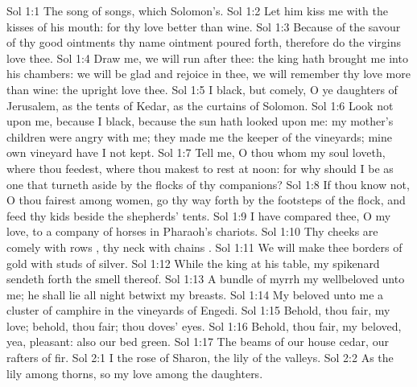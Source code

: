 \vs Sol 1:1 The song of songs, which  Solomon's.
\vs Sol 1:2 Let him kiss me with the kisses of his mouth: for thy love  better than wine.
\vs Sol 1:3 Because of the savour of thy good ointments thy name  ointment poured forth, therefore do the virgins love thee.
\vs Sol 1:4 Draw me, we will run after thee: the king hath brought me into his chambers: we will be glad and rejoice in thee, we will remember thy love more than wine: the upright love thee.
\vs Sol 1:5 I  black, but comely, O ye daughters of Jerusalem, as the tents of Kedar, as the curtains of Solomon.
\vs Sol 1:6 Look not upon me, because I  black, because the sun hath looked upon me: my mother's children were angry with me; they made me the keeper of the vineyards;  mine own vineyard have I not kept.
\vs Sol 1:7 Tell me, O thou whom my soul loveth, where thou feedest, where thou makest  to rest at noon: for why should I be as one that turneth aside by the flocks of thy companions?
\vs Sol 1:8 If thou know not, O thou fairest among women, go thy way forth by the footsteps of the flock, and feed thy kids beside the shepherds' tents.
\vs Sol 1:9 I have compared thee, O my love, to a company of horses in Pharaoh's chariots.
\vs Sol 1:10 Thy cheeks are comely with rows , thy neck with chains .
\vs Sol 1:11 We will make thee borders of gold with studs of silver.
\vs Sol 1:12 While the king  at his table, my spikenard sendeth forth the smell thereof.
\vs Sol 1:13 A bundle of myrrh  my wellbeloved unto me; he shall lie all night betwixt my breasts.
\vs Sol 1:14 My beloved  unto me  a cluster of camphire in the vineyards of Engedi.
\vs Sol 1:15 Behold, thou  fair, my love; behold, thou  fair; thou  doves' eyes.
\vs Sol 1:16 Behold, thou  fair, my beloved, yea, pleasant: also our bed  green.
\vs Sol 1:17 The beams of our house  cedar,  our rafters of fir.
\vs Sol 2:1 I  the rose of Sharon,  the lily of the valleys.
\vs Sol 2:2 As the lily among thorns, so  my love among the daughters.
